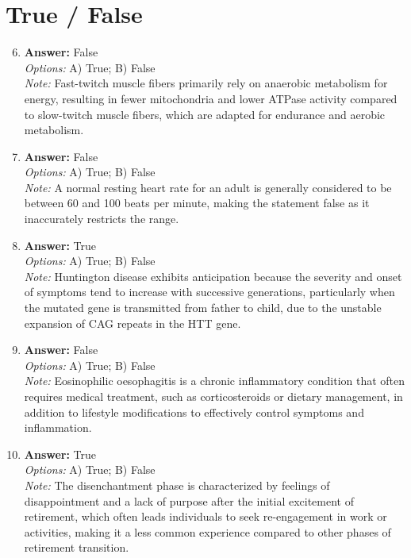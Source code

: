 \documentclass[12pt]{article}
\begin{document}
\section*{True / False}
\begin{enumerate}[label=\arabic*.]
\setcounter{enumi}{5}
\item \textbf{Answer:} False
\\ \textit{Options:} A) True; B) False
\\ \textit{Note:} Fast-twitch muscle fibers primarily rely on anaerobic metabolism for energy, resulting in fewer mitochondria and lower ATPase activity compared to slow-twitch muscle fibers, which are adapted for endurance and aerobic metabolism.
\item \textbf{Answer:} False
\\ \textit{Options:} A) True; B) False
\\ \textit{Note:} A normal resting heart rate for an adult is generally considered to be between 60 and 100 beats per minute, making the statement false as it inaccurately restricts the range.
\item \textbf{Answer:} True
\\ \textit{Options:} A) True; B) False
\\ \textit{Note:} Huntington disease exhibits anticipation because the severity and onset of symptoms tend to increase with successive generations, particularly when the mutated gene is transmitted from father to child, due to the unstable expansion of CAG repeats in the HTT gene.
\item \textbf{Answer:} False
\\ \textit{Options:} A) True; B) False
\\ \textit{Note:} Eosinophilic oesophagitis is a chronic inflammatory condition that often requires medical treatment, such as corticosteroids or dietary management, in addition to lifestyle modifications to effectively control symptoms and inflammation.
\item \textbf{Answer:} True
\\ \textit{Options:} A) True; B) False
\\ \textit{Note:} The disenchantment phase is characterized by feelings of disappointment and a lack of purpose after the initial excitement of retirement, which often leads individuals to seek re-engagement in work or activities, making it a less common experience compared to other phases of retirement transition.
\end{enumerate}
\end{document}
